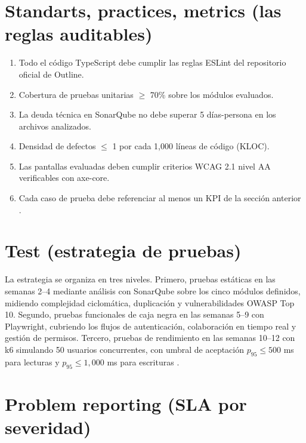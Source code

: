 \documentclass{report}
\begin{document}
\section*{Standarts, practices, metrics (las reglas auditables)}

\begin{enumerate}
    \item Todo el código TypeScript debe cumplir las reglas ESLint del repositorio oficial de Outline.
    \item Cobertura de pruebas unitarias $\geq$ 70\% sobre los módulos evaluados.
    \item La deuda técnica en SonarQube no debe superar 5 días-persona en los archivos analizados.
    \item Densidad de defectos $\leq$ 1 por cada 1,000 líneas de código (KLOC).
    \item Las pantallas evaluadas deben cumplir criterios WCAG 2.1 nivel AA verificables con axe-core.
    \item Cada caso de prueba debe referenciar al menos un KPI de la sección anterior \cite{pressman2020}.
\end{enumerate}

\section*{Test (estrategia de pruebas)}

La estrategia se organiza en tres niveles. Primero, pruebas estáticas en las semanas 2--4 mediante análisis con SonarQube sobre los cinco módulos definidos, midiendo complejidad ciclomática, duplicación y vulnerabilidades OWASP Top 10. Segundo, pruebas funcionales de caja negra en las semanas 5--9 con Playwright, cubriendo los flujos de autenticación, colaboración en tiempo real y gestión de permisos. Tercero, pruebas de rendimiento en las semanas 10--12 con k6 simulando 50 usuarios concurrentes, con umbral de aceptación $p_{95} \leq 500$ ms para lecturas y $p_{95} \leq 1{,}000$ ms para escrituras \cite{k6_2024}.

\section*{Problem reporting (SLA por severidad)}
\end{document}
